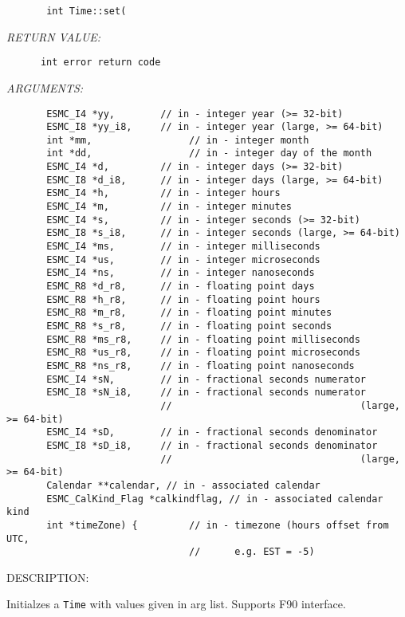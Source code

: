   
\begin{verbatim}       int Time::set(\end{verbatim}{\em RETURN VALUE:}
\begin{verbatim}      int error return code\end{verbatim}{\em ARGUMENTS:}
\begin{verbatim}       ESMC_I4 *yy,        // in - integer year (>= 32-bit)
       ESMC_I8 *yy_i8,     // in - integer year (large, >= 64-bit)
       int *mm,                 // in - integer month
       int *dd,                 // in - integer day of the month
       ESMC_I4 *d,         // in - integer days (>= 32-bit)
       ESMC_I8 *d_i8,      // in - integer days (large, >= 64-bit)
       ESMC_I4 *h,         // in - integer hours
       ESMC_I4 *m,         // in - integer minutes
       ESMC_I4 *s,         // in - integer seconds (>= 32-bit)
       ESMC_I8 *s_i8,      // in - integer seconds (large, >= 64-bit)
       ESMC_I4 *ms,        // in - integer milliseconds
       ESMC_I4 *us,        // in - integer microseconds
       ESMC_I4 *ns,        // in - integer nanoseconds
       ESMC_R8 *d_r8,      // in - floating point days
       ESMC_R8 *h_r8,      // in - floating point hours
       ESMC_R8 *m_r8,      // in - floating point minutes
       ESMC_R8 *s_r8,      // in - floating point seconds
       ESMC_R8 *ms_r8,     // in - floating point milliseconds
       ESMC_R8 *us_r8,     // in - floating point microseconds
       ESMC_R8 *ns_r8,     // in - floating point nanoseconds
       ESMC_I4 *sN,        // in - fractional seconds numerator
       ESMC_I8 *sN_i8,     // in - fractional seconds numerator
                           //                                 (large, >= 64-bit)
       ESMC_I4 *sD,        // in - fractional seconds denominator
       ESMC_I8 *sD_i8,     // in - fractional seconds denominator
                           //                                 (large, >= 64-bit)
       Calendar **calendar, // in - associated calendar
       ESMC_CalKind_Flag *calkindflag, // in - associated calendar kind
       int *timeZone) {         // in - timezone (hours offset from UTC,
                                //      e.g. EST = -5)\end{verbatim}
{\sf DESCRIPTION:\\ }


        Initialzes a {\tt Time} with values given in arg list. Supports
        F90 interface.
   
 
